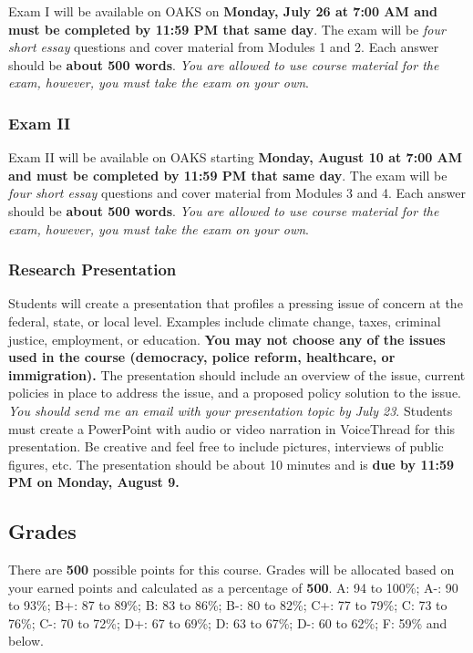 Exam I will be available on OAKS on \textbf{Monday, July 26 at 7:00 AM
and must be completed by 11:59 PM that same day}. The exam will be
\emph{four short essay} questions and cover material from Modules 1 and
2. Each answer should be \textbf{about 500 words}. \emph{You are allowed
to use course material for the exam, however, you must take the exam on
your own}.

\hypertarget{exam-ii}{%
\subsubsection{Exam II}\label{exam-ii}}

Exam II will be available on OAKS starting \textbf{Monday, August 10 at
7:00 AM and must be completed by 11:59 PM that same day}. The exam will
be \emph{four short essay} questions and cover material from Modules 3
and 4. Each answer should be \textbf{about 500 words}. \emph{You are
allowed to use course material for the exam, however, you must take the
exam on your own}.

\hypertarget{research-presentation}{%
\subsubsection{Research Presentation}\label{research-presentation}}

Students will create a presentation that profiles a pressing issue of
concern at the federal, state, or local level. Examples include climate
change, taxes, criminal justice, employment, or education. \textbf{You
may not choose any of the issues used in the course (democracy, police
reform, healthcare, or immigration).} The presentation should include an
overview of the issue, current policies in place to address the issue,
and a proposed policy solution to the issue. \emph{You should send me an
email with your presentation topic by July 23}. Students must create a
PowerPoint with audio or video narration in VoiceThread for this
presentation. Be creative and feel free to include pictures, interviews
of public figures, etc. The presentation should be about 10 minutes and
is \textbf{due by 11:59 PM on Monday, August 9.}

\hypertarget{grades}{%
\subsection{Grades}\label{grades}}

There are \textbf{500} possible points for this course. Grades will be
allocated based on your earned points and calculated as a percentage of
\textbf{500}. A: 94 to 100\%; A-: 90 to 93\%; B+: 87 to 89\%; B: 83 to
86\%; B-: 80 to 82\%; C+: 77 to 79\%; C: 73 to 76\%; C-: 70 to 72\%; D+:
67 to 69\%; D: 63 to 67\%; D-: 60 to 62\%; F: 59\% and below.


